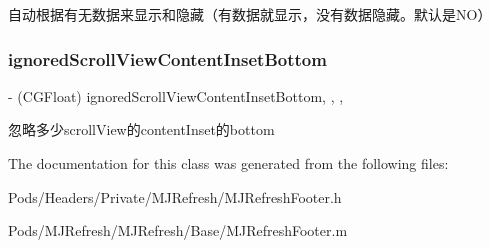 自动根据有无数据来显示和隐藏（有数据就显示，没有数据隐藏。默认是\+N\+O） \mbox{\label{interface_m_j_refresh_footer_a7ab5c8c115a1a3162cd50471ff36597c}} 
\subsubsection{\texorpdfstring{ignored\+Scroll\+View\+Content\+Inset\+Bottom}{ignoredScrollViewContentInsetBottom}}
{\footnotesize\ttfamily -\/ (C\+G\+Float) ignored\+Scroll\+View\+Content\+Inset\+Bottom\hspace{0.3cm}{\ttfamily [read]}, {\ttfamily [write]}, {\ttfamily [nonatomic]}, {\ttfamily [assign]}}

忽略多少scroll\+View的content\+Inset的bottom 

The documentation for this class was generated from the following files\+:\begin{DoxyCompactItemize}
\item 
Pods/\+Headers/\+Private/\+M\+J\+Refresh/M\+J\+Refresh\+Footer.\+h\item 
Pods/\+M\+J\+Refresh/\+M\+J\+Refresh/\+Base/M\+J\+Refresh\+Footer.\+m\end{DoxyCompactItemize}
